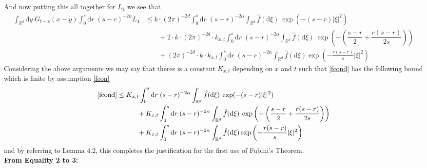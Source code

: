 \documentclass{article}
\numberwithin{equation}{section}
\newcommand{\R}{\mathbb{R}}
\newcommand{\ud}{\ensuremath{\mathrm{d}}}
\begin{document}
And now putting this all together for $L_4$ we see that 
\begin{align*}
\int_{\R^d}\ud y \;G_{t-s}(x-y)\int_0^s\ud r\; (s-r)^{-2\alpha}L_4 &\le k\cdot (2\pi)^{-2d}\int_0^s\ud r\; (s-r)^{-2\alpha}\int_{\R^d}\hat f (\ud \xi)\: \exp(-(s-r)|\xi|^2)
\\&\hspace{2em}+ 2\cdot k \cdot (2\pi)^{-2d} \cdot k_{x,t}\int_0^s\ud r\; (s-r)^{-2\alpha}\int_{\R^d}\hat f(\ud \xi) \: \exp\left(-\left(\dfrac{s-r}{2}+\dfrac{r(s-r)}{2s}\right)\right)
\\&\hspace{2em} + (2\pi)^{-2d} \cdot k \cdot k_{x,t} \int_0^s\ud r\; (s-r)^{-2\alpha}\int_{\R^d} \hat{f}(\ud \xi)\exp\left(-\frac{r(s-r)}{s}|\xi|^2\right)
\end{align*}
Considering the above arguments we may say that theres is a constant $K_{x,t}$ depending on $x$ and $t$ such that \eqref{fcond} has the following bound which is finite by assumption \ref{fcon}
\begin{align*}
\eqref{fcond} &\le K_{x,t}\int_0^s\ud r\; (s-r)^{-2\alpha}\int_{\R^d}\hat f (\ud \xi)\: \exp(-(s-r)|\xi|^2)
\\&\hspace{3em}+ K_{x,t}\int_0^s\ud r\; (s-r)^{-2\alpha}\int_{\R^d}\hat f(\ud \xi) \: \exp\left(-\left(\dfrac{s-r}{2}+\dfrac{r(s-r)}{2s}\right)\right)
\\&\hspace{3em} + K_{x,t}\int_0^s\ud r\; (s-r)^{-2\alpha}\int_{\R^d} \hat{f}(\ud \xi)\exp\left(-\frac{r(s-r)}{s}|\xi|^2\right)
\end{align*}
and by referring to Lemma 4.2, this completes the justification for the first use of Fubini's Theorem. \\

\noindent \textbf{From Equality 2 to 3:}\\
\end{document}
